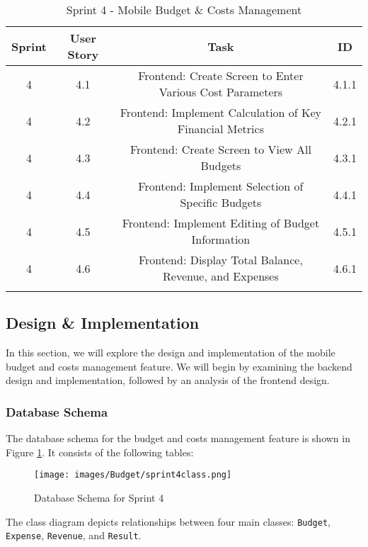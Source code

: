 \setlength{\LTleft}{0pt}
\begin{longtable}{|c|c|c|c|}
\hline
\textbf{Sprint} & \textbf{User Story} & \textbf{Task} & \textbf{ID} \\
\hline
4 & 4.1 & Frontend: Create Screen to Enter Various Cost Parameters & 4.1.1 \\
\hline
4 & 4.2 & Frontend: Implement Calculation of Key Financial Metrics & 4.2.1 \\
\hline
4 & 4.3 & Frontend: Create Screen to View All Budgets & 4.3.1 \\
\hline
4 & 4.4 & Frontend: Implement Selection of Specific Budgets & 4.4.1 \\
\hline
4 & 4.5 & Frontend: Implement Editing of Budget Information & 4.5.1 \\
\hline
4 & 4.6 & Frontend: Display Total Balance, Revenue, and Expenses & 4.6.1 \\
\hline
\caption{Sprint 4 - Mobile Budget \& Costs Management}
\label{tab:sprint4_backlog}
\end{longtable}

\subsection{Design \& Implementation}

In this section, we will explore the design and implementation of the mobile budget and costs management feature. We will begin by examining the backend design and implementation, followed by an analysis of the frontend design.

\subsubsection{Database Schema}

The database schema for the budget and costs management feature is shown in Figure \ref{fig:db_schema_sprint4}. It consists of the following tables:

\begin{figure}[H]
    \centering
    \texttt{[image: images/Budget/sprint4class.png]}
    \caption{Database Schema for Sprint 4}
    \label{fig:db_schema_sprint4}
\end{figure}

The class diagram depicts relationships between four main classes: \texttt{Budget}, \texttt{Expense}, \texttt{Revenue}, and \texttt{Result}.


